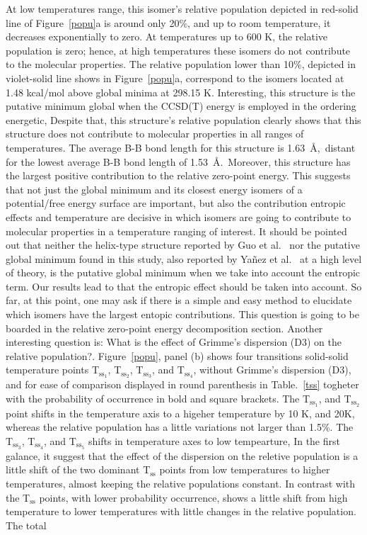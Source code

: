\documentclass[prb,aps,preprint,showkeys,showpacs]{revtex4}
\begin{document}
At low temperatures range, this isomer's relative population depicted in red-solid line of Figure~\ref{popu}a is around only 20{\%}, and up to room temperature, it decreases exponentially to zero. At temperatures up to 600 K, the relative population is zero; hence, at high temperatures these isomers do not contribute to the molecular properties. The relative population lower than 10{\%}, depicted in violet-solid line shows in Figure~\ref{popu}a, correspond to the isomers located at 1.48 kcal/mol above global minima at 298.15 K.
Interesting, this structure is the putative minimum global when the CCSD(T) energy is employed in the ordering energetic,
Despite that, this structure's relative population clearly shows that this structure does not contribute to molecular properties in all ranges of temperatures.  The average B-B bond length for this structure is 1.63~\AA,~distant for the lowest average B-B bond length of 1.53~\AA.~Moreover, this structure has the largest positive contribution to the relative zero-point energy. This suggests that not just the global minimum and its closest energy isomers of a potential/free energy surface are important, but also the contribution entropic effects and temperature are decisive in which isomers are going to contribute to molecular properties in a temperature ranging of interest. It should be pointed out that neither the helix-type structure reported by Guo et al.~\cite{Guo} nor the putative global minimum found in this study,  also reported by Ya\~nez et al.~\cite{Osvaldo} at a high level of theory, is the putative global minimum when we take into account the entropic term. Our results lead to that the entropic effect should be taken into account. So far, at this point, one may ask if there is a simple and easy method to elucidate which isomers have the largest entopic contributions. This question is going to be boarded in the relative zero-point energy decomposition section.  Another  interesting  question is: What is the effect of Grimme's dispersion (D3) on the relative population?. Figure~\ref{popu}, panel (b) shows four transitions solid-solid temperature points {\large{T$_{\textrm{ss$_1$}}$}}, {\large{T$_{\textrm{ss$_2$}}$}}, {\large{T$_{\textrm{ss$_3$}}$}}, and {\large{T$_{\textrm{ss$_4$}}$}}, without Grimme’s dispersion (D3), and for ease of comparison displayed in round parenthesis in Table.~\ref{tss} togheter with the probability of occurrence in bold and square brackets.  The {\large{T$_{\textrm{ss$_1$}}$}}, and  {\large{T$_{\textrm{ss$_2$}}$}}  point shifts in the temperature axis to a higeher temperature by 10 K, and 20K, whereas the relative population has a little variations not larger than 1.5{\%}. The {\large{T$_{\textrm{ss$_3$}}$}}, {\large{T$_{\textrm{ss$_4$}}$}}, and {\large{T$_{\textrm{ss$_5$}}$}} shifts in temperature axes to low tempearture, In the first galance, it suggest that the effect of the dispersion on the  reletive population is a little shift of  the two dominant {\large{T$_{\textrm{ss}}$}} points from low temperatures to higher temperatures, almost keeping the relative populations constant. In contrast with the {\large{T$_{\textrm{ss}}$}} points, with lower probability occurrence, shows a little  shift from high temperature to lower temperatures with little changes in the relative population. The total 
\end{document}
